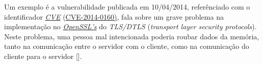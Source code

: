 Um exemplo é a vulnerabilidade publicada em 10/04/2014, referênciado com o identificador
\emph{\href{https://cve.mitre.org/}{CVE}}
(\href{https://web.nvd.nist.gov/view/vuln/detail?vulnId=CVE-2014-0160}{CVE-2014-0160)}, fala sobre um grave
problema na implementação no \emph{\href{https://www.openssl.org}{OpenSSL’s}} do \emph{TLS/DTLS} (\emph{transport
layer security protocols}). Neste problema, uma pessoa mal intencionada poderia roubar dados da memória, tanto
na comunicação entre o servidor com o cliente, como na comunicação do cliente para o servidor
[].